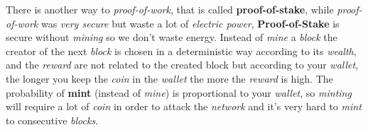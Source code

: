 \documentclass{article}
\begin{document}
There is another way to \emph{proof-of-work}, that is called \textbf{proof-of-stake}, while \emph{proof-of-work} was \emph{very secure} but waste a lot of \emph{electric power}, \textbf{Proof-of-Stake} is secure without \emph{mining} so we don't waste energy. Instead of \emph{mine} a \emph{block} the creator of the next \emph{block} is chosen in a deterministic way according to its \emph{wealth}, and the \emph{reward} are not related to the created block but according to your \emph{wallet}, the longer you keep the \emph{coin} in the \emph{wallet} the more the \emph{reward} is high. The probability of \textbf{mint} (instead of \emph{mine}) is proportional to your \emph{wallet}, so \emph{minting} will require a lot of \emph{coin} in order to attack the \emph{network} and it's very hard to \emph{mint} to consecutive \emph{blocks}. 
\end{document}
